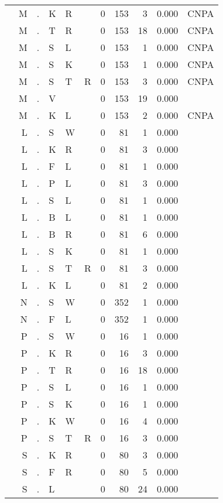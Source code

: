 \begin{longtable}{r@{ } r@{ } c@{ } l@{ } l@{ } l@{ } r r r r l }
  & M & . & K & R &   & 0 & 153 & 3 & 0.000 & \textsc{CNPA} \\
  & M & . & T & R &   & 0 & 153 & 18 & 0.000 & \textsc{CNPA} \\
  & M & . & S & L &   & 0 & 153 & 1 & 0.000 & \textsc{CNPA} \\
  & M & . & S & K &   & 0 & 153 & 1 & 0.000 & \textsc{CNPA} \\
  & M & . & S & T & R & 0 & 153 & 3 & 0.000 & \textsc{CNPA} \\
  & M & . & V &   &   & 0 & 153 & 19 & 0.000 &  \\
  & M & . & K & L &   & 0 & 153 & 2 & 0.000 & \textsc{CNPA} \\
  & L & . & S & W &   & 0 & 81 & 1 & 0.000 &  \\
  & L & . & K & R &   & 0 & 81 & 3 & 0.000 &  \\
  & L & . & F & L &   & 0 & 81 & 1 & 0.000 &  \\
  & L & . & P & L &   & 0 & 81 & 3 & 0.000 &  \\
  & L & . & S & L &   & 0 & 81 & 1 & 0.000 &  \\
  & L & . & B & L &   & 0 & 81 & 1 & 0.000 &  \\
  & L & . & B & R &   & 0 & 81 & 6 & 0.000 &  \\
  & L & . & S & K &   & 0 & 81 & 1 & 0.000 &  \\
  & L & . & S & T & R & 0 & 81 & 3 & 0.000 &  \\
  & L & . & K & L &   & 0 & 81 & 2 & 0.000 &  \\
  & N & . & S & W &   & 0 & 352 & 1 & 0.000 &  \\
  & N & . & F & L &   & 0 & 352 & 1 & 0.000 &  \\
  & P & . & S & W &   & 0 & 16 & 1 & 0.000 &  \\
  & P & . & K & R &   & 0 & 16 & 3 & 0.000 &  \\
  & P & . & T & R &   & 0 & 16 & 18 & 0.000 &  \\
  & P & . & S & L &   & 0 & 16 & 1 & 0.000 &  \\
  & P & . & S & K &   & 0 & 16 & 1 & 0.000 &  \\
  & P & . & K & W &   & 0 & 16 & 4 & 0.000 &  \\
  & P & . & S & T & R & 0 & 16 & 3 & 0.000 &  \\
  & S & . & K & R &   & 0 & 80 & 3 & 0.000 &  \\
  & S & . & F & R &   & 0 & 80 & 5 & 0.000 &  \\
  & S & . & L &   &   & 0 & 80 & 24 & 0.000 &  \\

\end{longtable}
